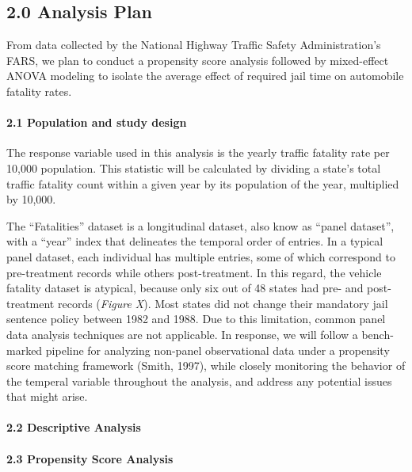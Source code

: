 \documentclass[]{article}
\let\oldparagraph\paragraph
\renewcommand{\paragraph}[1]{\oldparagraph{#1}\mbox{}}
\begin{document}
\hypertarget{analysis-plan}{%
\subsection{2.0 Analysis Plan}\label{analysis-plan}}

From data collected by the National Highway Traffic Safety Administration's FARS, we plan to conduct a propensity score analysis followed by mixed-effect ANOVA modeling to isolate the average effect of required jail time on automobile fatality rates.

\hypertarget{population-and-study-design}{%
\paragraph{2.1 Population and study design}\label{population-and-study-design}}

The response variable used in this analysis is the yearly traffic fatality rate per 10,000 population. This statistic will be calculated by dividing a state's total traffic fatality count within a given year by its population of the year, multiplied by 10,000.

The ``Fatalities'' dataset is a longitudinal dataset, also know as ``panel dataset'', with a ``year'' index that delineates the temporal order of entries. In a typical panel dataset, each individual has multiple entries, some of which correspond to pre-treatment records while others post-treatment. In this regard, the vehicle fatality dataset is atypical, because only six out of 48 states had pre- and post-treatment records (\emph{Figure X}). Most states did not change their mandatory jail sentence policy between 1982 and 1988. Due to this limitation, common panel data analysis techniques are not applicable. In response, we will follow a bench-marked pipeline for analyzing non-panel observational data under a propensity score matching framework (Smith, 1997), while closely monitoring the behavior of the temperal variable throughout the analysis, and address any potential issues that might arise.

\hypertarget{descriptive-analysis}{%
\paragraph{2.2 Descriptive Analysis}\label{descriptive-analysis}}

\hypertarget{propensity-score-analysis}{%
\paragraph{2.3 Propensity Score Analysis}\label{propensity-score-analysis}}
\end{document}
